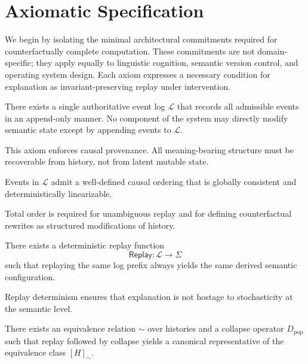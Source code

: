 \documentclass[11pt]{article}
\begin{document}
\section{Axiomatic Specification}

We begin by isolating the minimal architectural commitments required for counterfactually complete computation. These commitments are not domain-specific; they apply equally to linguistic cognition, semantic version control, and operating system design. Each axiom expresses a necessary condition for explanation as invariant-preserving replay under intervention.

\begin{axiom}
\label{ax:log}
There exists a single authoritative event log $\mathcal{L}$ that records all admissible events in an append-only manner. No component of the system may directly modify semantic state except by appending events to $\mathcal{L}$.
\end{axiom}

This axiom enforces causal provenance. All meaning-bearing structure must be recoverable from history, not from latent mutable state.

\begin{axiom}
\label{ax:order}
Events in $\mathcal{L}$ admit a well-defined causal ordering that is globally consistent and deterministically linearizable.
\end{axiom}

Total order is required for unambiguous replay and for defining counterfactual rewrites as structured modifications of history.

\begin{axiom}
\label{ax:replay}
There exists a deterministic replay function
\[
\mathsf{Replay} : \mathcal{L} \to \Sigma
\]
such that replaying the same log prefix always yields the same derived semantic configuration.
\end{axiom}

Replay determinism ensures that explanation is not hostage to stochasticity at the semantic level.

\begin{axiom}
\label{ax:collapse}
There exists an equivalence relation $\sim$ over histories and a collapse operator $D_{\mathrm{pop}}$ such that replay followed by collapse yields a canonical representative of the equivalence class $[H]_{\sim}$.
\end{axiom}
\end{document}

